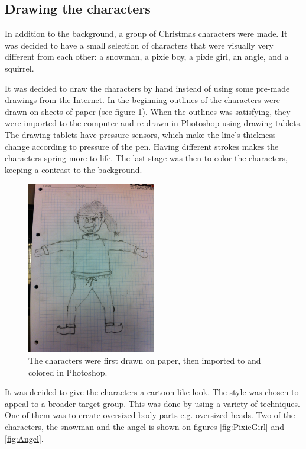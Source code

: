 \subsection{Drawing the characters}
In addition to the background, a group of Christmas characters were made. It was decided to have a small selection of characters that were visually very different from each other: a snowman, a pixie boy, a pixie girl, an angle, and a squirrel.

It was decided to draw the characters by hand instead of using some pre-made drawings from the Internet. In the beginning outlines of the characters were drawn on sheets of paper (see figure \ref{fig:boy_sketch}). When the outlines was satisfying, they were imported to the computer and re-drawn in Photoshop using drawing tablets. The drawing tablets have pressure sensors, which make the line's thickness change according to pressure of the pen. Having different strokes makes the characters spring more to life. The last stage was then to color the characters, keeping a contrast to the background.

\begin{figure}[htbp]
\centering
\includegraphics[width=0.50\textwidth]{Pictures/Design/boy_sketch}
\caption{The characters were first drawn on paper, then imported to and colored in Photoshop.}
\label{fig:boy_sketch}
\end{figure}

It was decided to give the characters a cartoon-like look. The style was chosen to appeal to a broader target group. This was done by using a variety of techniques. One of them was to create oversized body parts e.g. oversized heads. Two of the characters, the snowman and the angel is shown on figures \ref{fig:PixieGirl} and \ref{fig:Angel}.

